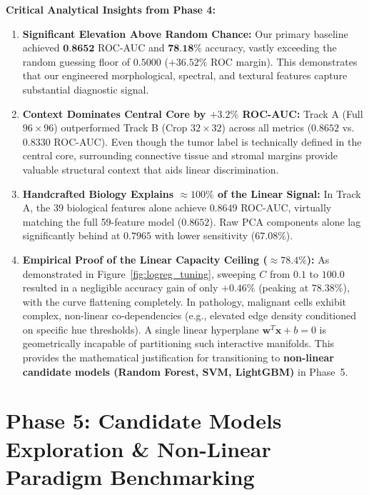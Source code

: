 \documentclass[11pt,a4paper]{article}
\begin{document}
\noindent\textbf{Critical Analytical Insights from Phase 4:}
\begin{enumerate}
    \item \textbf{Significant Elevation Above Random Chance:}
    Our primary baseline achieved $\textbf{0.8652}$ ROC-AUC and $\textbf{78.18\%}$ accuracy, vastly exceeding the random guessing floor of $0.5000$ ($+36.52\%$ ROC margin). This demonstrates that our engineered morphological, spectral, and textural features capture substantial diagnostic signal.
    
    \item \textbf{Context Dominates Central Core by $+3.2\%$ ROC-AUC:}
    Track A (Full $96 \times 96$) outperformed Track B (Crop $32 \times 32$) across all metrics ($0.8652$ vs. $0.8330$ ROC-AUC). Even though the tumor label is technically defined in the central core, surrounding connective tissue and stromal margins provide valuable structural context that aids linear discrimination.
    
    \item \textbf{Handcrafted Biology Explains $\approx 100\%$ of the Linear Signal:}
    In Track A, the 39 biological features alone achieve $0.8649$ ROC-AUC, virtually matching the full 59-feature model ($0.8652$). Raw PCA components alone lag significantly behind at $0.7965$ with lower sensitivity ($67.08\%$).
    
    \item \textbf{Empirical Proof of the Linear Capacity Ceiling ($\approx 78.4\%$):}
    As demonstrated in Figure~\ref{fig:logreg_tuning}, sweeping $C$ from $0.1$ to $100.0$ resulted in a negligible accuracy gain of only $+0.46\%$ (peaking at $78.38\%$), with the curve flattening completely. In pathology, malignant cells exhibit complex, non-linear co-dependencies (e.g., elevated edge density conditioned on specific hue thresholds). A single linear hyperplane $\mathbf{w}^T \mathbf{x} + b = 0$ is geometrically incapable of partitioning such interactive manifolds. This provides the mathematical justification for transitioning to \textbf{non-linear candidate models (Random Forest, SVM, LightGBM)} in Phase~5.
\end{enumerate}

\section{Phase 5: Candidate Models Exploration \& Non-Linear Paradigm Benchmarking}
\end{document}
